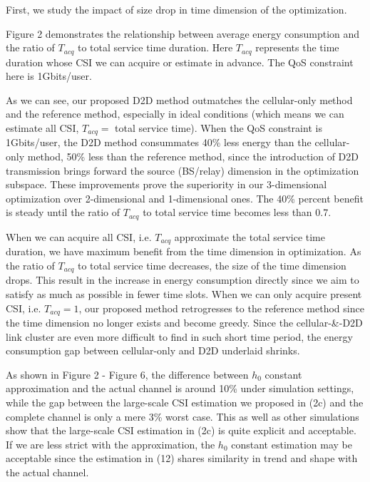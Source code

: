 \documentclass{ieeeaccess}
\begin{document}

First, we study the impact of size drop in time dimension of the optimization. 

Figure 2 demonstrates the relationship between average energy consumption and the ratio of ${T_{acq}}$ to total service time duration. Here ${T_{acq}}$ represents the time duration whose CSI we can acquire or estimate in advance. The QoS constraint here is 1Gbits/user. 

As we can see, our proposed D2D method outmatches the cellular-only method and the reference method, especially in ideal conditions (which means we can estimate all CSI, ${T_{acq}}=$ total service time). When the QoS constraint is 1Gbits/user, the D2D method consummates 40\% less energy than the cellular-only method, 50\% less than the reference method, since the introduction of D2D transmission brings forward the source (BS/relay) dimension in the optimization subspace. These improvements prove the superiority in our 3-dimensional optimization over 2-dimensional and 1-dimensional ones. The 40\% percent benefit is steady until the ratio of ${T_{acq}}$ to total service time becomes less than 0.7. 

When we can acquire all CSI, i.e. ${T_{acq}}$ approximate the total service time duration, we have maximum benefit from the time dimension in optimization. As the ratio of ${T_{acq}}$ to total service time decreases, the size of the time dimension drops. This result in the increase in energy consumption directly since we aim to satisfy as much as possible in fewer time slots. When we can only acquire present CSI, i.e. ${T_{acq}} = 1$, our proposed method retrogresses to the reference method since the time dimension no longer exists and become greedy. Since the cellular-\&-D2D link cluster are even more difficult to find in such short time period, the energy consumption gap between cellular-only and D2D underlaid shrinks.  

As shown in Figure 2 - Figure 6, the difference between ${h_0}$ constant approximation and the actual channel is around 10\% under simulation settings, while the gap between the large-scale CSI estimation we proposed in (2c) and the complete channel is only a mere 3\% worst case. This as well as other simulations show that the large-scale CSI estimation in (2c) is quite explicit and acceptable. If we are less strict with the approximation, the ${h_0}$ constant estimation may be acceptable since the estimation in (12) shares similarity in trend and shape with the actual channel. 
\end{document}
